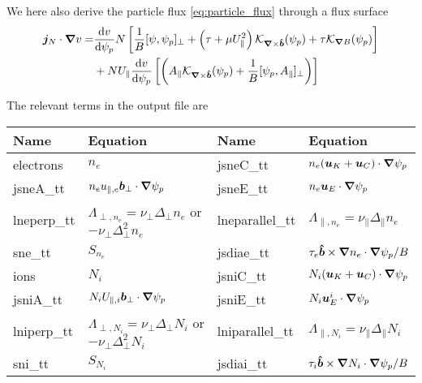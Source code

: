 We here also derive the particle flux \eqref{eq:particle_flux} through a flux surface
\begin{align} \label{eq:radial_particle_flux}
 \vec j_{N}\cn v %
 =&
  \frac{\d v}{\d \psi_p} N\left[\frac{1}{B}[\psi, \psi_p]_\perp + \left(\tau + \mu U_\parallel^2\right)
   \mathcal K_{\vn\times\bhat}(\psi_p) + \tau  \mathcal K_{\vn B}(\psi_p) \right] \nonumber\\
 &+ NU_\parallel\frac{\d v}{\d \psi_p}\left [\left( A_\parallel \mathcal
 K_{\vn\times\bhat}(\psi_p) + \frac{1}{B}[\psi_p, A_\parallel]_\perp\right) \right]
\end{align}

The relevant terms in the output file are
\begin{longtable}{llll}
\toprule
\rowcolor{gray!50}\textbf{Name} &  \textbf{Equation} & \textbf{Name} &  \textbf{Equation}\\
\midrule
    electrons & $n_e$ &
    jsneC\_tt &$ n_e ( {\boldsymbol{u}}_K + {\boldsymbol{u}}_C )\cdot{\boldsymbol{\nabla}} \psi_p$ \\
    jsneA\_tt &$ n_e u_{\parallel,e} {\boldsymbol{ b}}_\perp  \cdot{\boldsymbol{\nabla}} \psi_p$ &
    jsneE\_tt & $ n_e {\boldsymbol{u}}_E\cdot{\boldsymbol{\nabla}}\psi_p$ \\
    lneperp\_tt &$ \Lambda_{\perp,n_e} = \nu_\perp \Delta_\perp n_e$ or $-\nu_\perp \Delta^2_\perp n_e$ &
    lneparallel\_tt &$ \Lambda_{\parallel,n_e} = \nu_\parallel \Delta_\parallel n_e$ \\
    sne\_tt & $S_{n_e}$ &
    jsdiae\_tt & $\tau_e \bm{\hat{b}} \times {\boldsymbol{\nabla}} n_e \cdot{\boldsymbol{\nabla}} \psi_p /B$\\
    ions & $N_i$ &
    jsniC\_tt &$ N_i ( {\boldsymbol{u}}_K + {\boldsymbol{u}}_C )\cdot{\boldsymbol{\nabla}} \psi_p$ \\
    jsniA\_tt &$ N_i U_{\parallel,i} {\boldsymbol{ b}}_\perp  \cdot{\boldsymbol{\nabla}} \psi_p$ &
    jsniE\_tt & $ N_i {\boldsymbol{u}}^i_E\cdot{\boldsymbol{\nabla}}\psi_p$ \\
    lniperp\_tt &$ \Lambda_{\perp,N_i} = \nu_\perp \Delta_\perp N_i$ or $-\nu_\perp \Delta^2_\perp N_i$ &
    lniparallel\_tt &$ \Lambda_{\parallel,N_i} = \nu_\parallel \Delta_\parallel N_i$ \\
    sni\_tt & $S_{N_i}$ &
    jsdiai\_tt & $\tau_i \bm{\hat{b}} \times {\boldsymbol{\nabla}} N_i \cdot{\boldsymbol{\nabla}} \psi_p /B$\\
\bottomrule
\end{longtable}



